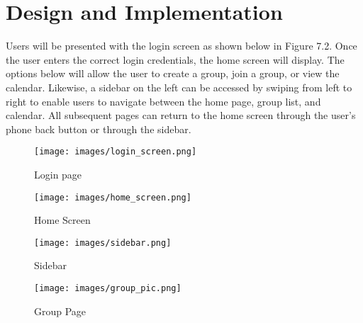 \chapter{Design and Implementation}
Users will be presented with the login screen as shown below in Figure 7.2. Once the user enters the correct login credentials, the home screen will display. The options below will allow the user to create a group, join a group, or view the calendar. Likewise, a sidebar on the left can be accessed by swiping from left to right to enable users to navigate between the home page, group list, and calendar. All subsequent pages can return to the home screen through the user’s phone back button or through the sidebar.

\begin{figure}[h]
	\centering
	\texttt{[image: images/login\_screen.png]}
	\caption{Login page}
	\label{fig:login screen}
\end{figure}

\begin{figure}[h]
	\centering
	\texttt{[image: images/home\_screen.png]}
	\caption{Home Screen}
	\label{fig:home screen}
\end{figure}

\begin{figure}[h]
	\centering
	\texttt{[image: images/sidebar.png]}
	\caption{Sidebar}
	\label{fig:sidebar}
\end{figure}

\begin{figure}[h]
	\centering
	\texttt{[image: images/group\_pic.png]}
	\caption{Group Page}
	\label{fig:group page}
\end{figure}